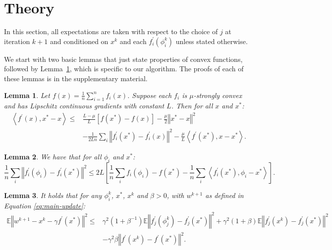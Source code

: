 \documentclass{article}
\newtheorem{lem}{Lemma}
\newcommand{\stepsize}{\gamma} %
\begin{document}
\vspace{-2mm}
\section{Theory}
\label{sec:theory}
\vspace{-2mm}
In this section, all expectations
are taken with respect to the choice of $j$ at iteration $k+1$ and
conditioned on $x^{k}$ and each $f_{i}^{\prime}(\phi_{i}^{k})$
unless stated otherwise.

We start with two basic lemmas that just state properties of convex functions, followed by Lemma~\ref{lem:ip-bound}, which is specific to our algorithm. The proofs of each of these lemmas is in the supplementary material.


\begin{lem}
\label{lem:ip-bound}
Let $f(x)=\frac{1}{n}\sum_{i=1}^{n}f_{i}(x)$. Suppose each $f_i$ is $\mu$-strongly convex and has Lipschitz continuous gradients with constant $L$. Then for all $x$ and $x^{*}$:
\begin{align*}
\left\langle f^{\prime}(x),x^{*}-x\right\rangle  \leq {} &
\frac{L-\mu}{L}\left[f(x^{*})-f(x)\right]-\frac{\mu}{2}\left\Vert x^{*}-x\right\Vert ^{2} \\
& -\frac{1}{2Ln}\sum_{i}\left\Vert f_{i}^{\prime}(x^{*})-f_{i}^{\prime}(x)\right\Vert ^{2}-\frac{\mu}{L}\left\langle f^{\prime}(x^{*}),x-x^{*}\right\rangle. 
\end{align*}
\end{lem}
\begin{lem}
\label{lem:grad-diff-phii}We have that for all $\phi_{i}$ and $x^{*}$:
\[
\frac{1}{n}\sum_{i}\left\Vert f_{i}^{\prime}(\phi_{i})-f_{i}^{\prime}(x^{*})\right\Vert ^{2}
\leq 2L\left[\frac{1}{n}\sum_{i}f_{i}(\phi_{i})-f(x^{*})-\frac{1}{n}\sum_{i}\left\langle f_{i}^{\prime}(x^{*}),\phi_{i}-x^{*}\right\rangle \right].
\]
\end{lem}

\begin{lem}
\label{lem:wchange} It holds that for any $\phi_{i}^{k}$, $x^{*}$, $x^k$
and $\beta>0$, with $w^{k+1}$ as defined in Equation \ref{eq:main-update}:
\begingroup\makeatletter\def\f@size{9}\check@mathfonts
\begin{align*}
\mathbb{E}\left\Vert w^{k+1}-x^k-\stepsize f^{\prime}(x^{*})\right\Vert ^{2} 
\leq {} & \stepsize^2 (1+\beta^{-1}) \mathbb{E}\left\Vert f_{j}^{\prime}(\phi_{j}^{k})-f_{j}^{\prime}(x^{*})\right\Vert ^{2}
+ \stepsize^2 (1+\beta) \mathbb{E}\left\Vert f_{j}^{\prime}(x^k)-f_{j}^{\prime}(x^{*})\right\Vert ^{2} \\
&- \stepsize^2 \beta \left\Vert f^{\prime}(x^k)-f^{\prime}(x^{*}) \right\Vert ^{2}.
\end{align*}
\endgroup
\end{lem}
\end{document}
